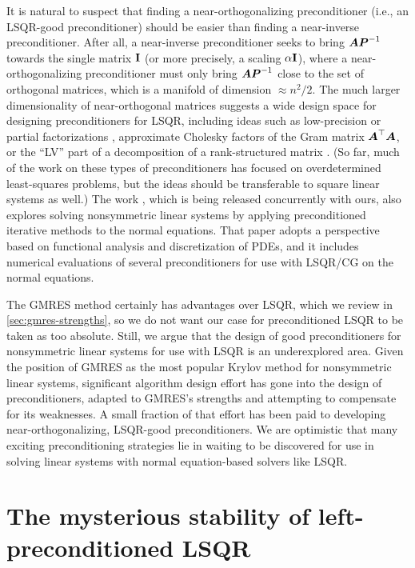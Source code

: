 \documentclass[onefignum,onetabnum,pagebackref,dvipsnames]{siamart220329}
\begin{document}
It is natural to suspect that finding a near-orthogonalizing preconditioner (i.e., an LSQR-good preconditioner) should be easier than finding a near-inverse preconditioner. 
After all, a near-inverse preconditioner seeks to bring $\boldsymbol{A}\boldsymbol{P}^{-1}$ towards the single matrix $\mathbf{I}$ (or more precisely, a scaling $\alpha \mathbf{I}$), where a near-orthogonalizing preconditioner must only bring $\boldsymbol{A}\boldsymbol{P}^{-1}$ close to the set of orthogonal matrices, which is a manifold of dimension $\approx n^2/2$.
The much larger dimensionality of near-orthogonal matrices suggests a wide design space for designing preconditioners for LSQR, including ideas such as low-precision or partial \QR factorizations \cite{LS06,CD25}, approximate Cholesky factors of the Gram matrix $\boldsymbol{A}^\top\boldsymbol{A}$, or the ``LV'' part of a \ULV decomposition of a rank-structured matrix \cite{CGP06}.
(So far, much of the work on these types of preconditioners has focused on overdetermined least-squares problems, but the ideas should be transferable to square linear systems as well.)
The work \cite{LLYNUZ2025}, which is being released concurrently with ours, also explores solving nonsymmetric linear systems by applying preconditioned iterative methods to the normal equations. That paper adopts a perspective based on functional analysis and discretization of PDEs, and it includes numerical evaluations of several preconditioners for use with LSQR/CG on the normal equations.

The GMRES method certainly has advantages over LSQR, which we review in \cref{sec:gmres-strengths}, so we do not want our case for preconditioned LSQR to be taken as too absolute.
Still, we argue that the design of good preconditioners for nonsymmetric linear systems for use with LSQR is an underexplored area.
Given the position of GMRES as the most popular Krylov method for nonsymmetric linear systems, significant algorithm design effort has gone into the design of preconditioners, adapted to GMRES's strengths and attempting to compensate for its weaknesses.
A small fraction of that effort has been paid to developing near-orthogonalizing, LSQR-good preconditioners.
We are optimistic that many exciting preconditioning strategies lie in waiting to be discovered for use in solving linear systems with normal equation-based solvers like LSQR.









\section{The mysterious stability of left-preconditioned LSQR} \label{sec:left-prec-lsqr}
\end{document}
